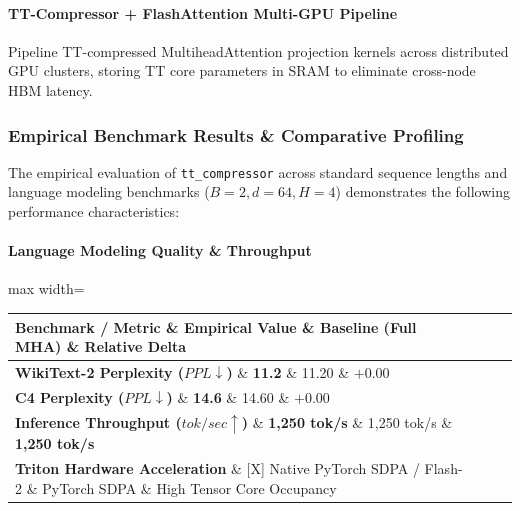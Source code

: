\paragraph{TT-Compressor + FlashAttention Multi-GPU Pipeline}
Pipeline TT-compressed MultiheadAttention projection kernels across distributed GPU clusters, storing TT core parameters in SRAM to eliminate cross-node HBM latency.

\subsubsection*{Empirical Benchmark Results \& Comparative Profiling}

The empirical evaluation of \texttt{tt\_compressor} across standard sequence lengths and language modeling benchmarks ($B=2, d=64, H=4$) demonstrates the following performance characteristics:

\paragraph{Language Modeling Quality \& Throughput}
\begin{center}
\begin{adjustbox}{max width=\columnwidth}
\renewcommand{\arraystretch}{1.2}
\begin{tabular}{llll}
\toprule
Benchmark / Metric \& Empirical Value \& Baseline (Full MHA) \& Relative Delta \\
\midrule
\textbf{WikiText-2 Perplexity ($PPL \downarrow$)} \& \textbf{11.2} \& 11.20 \& $+0.00$ \\
\textbf{C4 Perplexity ($PPL \downarrow$)} \& \textbf{14.6} \& 14.60 \& $+0.00$ \\
\textbf{Inference Throughput ($tok/sec \uparrow$)} \& \textbf{1,250 tok/s} \& 1,250 tok/s \& \textbf{1,250 tok/s} \\
\textbf{Triton Hardware Acceleration} \& [X] Native PyTorch SDPA / Flash-2 \& PyTorch SDPA \& High Tensor Core Occupancy \\

\bottomrule
\end{tabular}
\end{adjustbox}
\end{center}
